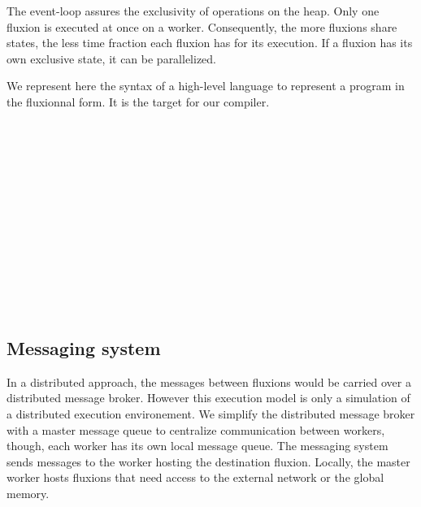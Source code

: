 The event-loop assures the exclusivity of operations on the heap.
Only one fluxion is executed at once on a worker.
Consequently, the more fluxions share states, the less time fraction each fluxion has for its execution.
If a fluxion has its own exclusive state, it can be parallelized.

We represent here the syntax of a high-level language to represent a program in the fluxionnal form.
It is the target for our compiler.
\begin{bnf*}
      { \bnfor {} \bnfsp {} \bnfsp {}}\\
          { \bnfsp {} \bnfsp {} \bnfsp {} \bnfsp {} \bnfsp {} \bnfsp {} \bnfsp {}}\\
       { \bnfsp {} \bnfor {}}\\
      { \bnfor {} \bnfor {} \bnfsp {} \bnfsp {}}\\
       { \bnfsp {} }\\
         {}\\
          {\bnfts{\texttt{\{}}  \bnfts{\texttt{\}}}}\\
          {\bnfts{\texttt{[}}  \bnfts{\texttt{]}}}\\
         { \bnfor {} \bnfsp \bnfts{,} \bnfsp {}}\\
           {\bnfts{\texttt{>}\texttt{>}} \bnfor \bnfts{\texttt{-}\texttt{>}}}\\
           {}\\
           {}\\
\end{bnf*}
\vspace{-2.5\baselineskip}


\subsection{Messaging system}

In a distributed approach, the messages between fluxions would be carried over a distributed message broker.
However this execution model is only a simulation of a distributed execution environement.
We simplify the distributed message broker with a master message queue to centralize communication between workers, though, each worker has its own local message queue.
The messaging system sends messages to the worker hosting the destination fluxion.
Locally, the master worker hosts fluxions that need access to the external network or the global memory.

